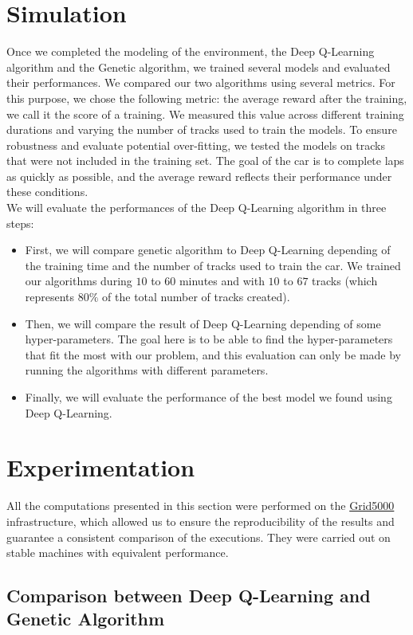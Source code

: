 \documentclass[11pt,a4paper]{article}
\newcommand{\mlist}[1]{\begin{itemize}[noitemsep,topsep=0pt]#1\end{itemize}}
\begin{document}
	
	\section*{Simulation}
Once we completed the modeling of the environment, the Deep Q-Learning algorithm and the Genetic algorithm, we trained several models and evaluated their performances. 
We compared our two algorithms using several metrics. 
For this purpose, we chose the following metric: the average reward after the training, we call it the score of a training. 
We measured this value across different training durations and varying the number of tracks used to train the models. 
To ensure robustness and evaluate potential over-fitting, we tested the models on tracks that were not included in the training set.
The goal of the car is to complete laps as quickly as possible, and the average reward reflects their performance under these conditions.
\\
We will evaluate the performances of the Deep Q-Learning algorithm in three steps: 
\mlist{
\item First, we will compare genetic algorithm to Deep Q-Learning depending of the training time and the number of tracks used to train the car. We trained our algorithms during $10$ to $60$ minutes and with $10$ to $67$ tracks (which represents $80\%$ of the total number of tracks created).
\item Then, we will compare the result of Deep Q-Learning depending of some hyper-parameters. The goal here is to be able to find the hyper-parameters that fit the most with our problem, and this evaluation can only be made by running the algorithms with different parameters.
\item Finally, we will evaluate the performance of the best model we found using Deep Q-Learning.
}

    \section*{Experimentation}

All the computations presented in this section were performed on the \href{https://www.grid5000.fr}{Grid5000} infrastructure, which allowed us to ensure the reproducibility of the results and guarantee a consistent comparison of the executions. 
They were carried out on stable machines with equivalent performance.

\subsection*{Comparison between Deep Q-Learning and Genetic Algorithm}
\end{document}
